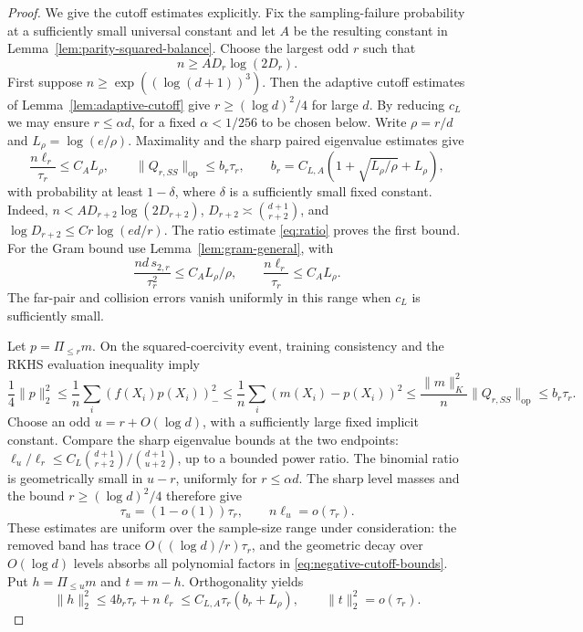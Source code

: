 \begin{proof}
We give the cutoff estimates explicitly. Fix the sampling-failure
probability at a sufficiently small universal constant and let $A$ be
the resulting constant in Lemma~\ref{lem:parity-squared-balance}.
Choose the largest odd $r$ such that
\[
 n\ge A D_r\log(2D_r).
\]
First suppose $n\ge\exp((\log(d+1))^3)$. Then the adaptive cutoff
estimates of Lemma~\ref{lem:adaptive-cutoff} give
$r\ge(\log d)^2/4$ for large $d$. By reducing $c_L$ we may ensure
$r\le\alpha d$, for a fixed $\alpha<1/256$ to be chosen below.
Write $\rho=r/d$ and $L_\rho=\log(e/\rho)$.
Maximality and the sharp paired eigenvalue estimates give
\begin{equation}\label{eq:negative-cutoff-bounds}
 \frac{n\ell_r}{\tau_r}\le C_A L_\rho,
 \qquad
 \|Q_{r,SS}\|_{\mathrm{op}}\le b_r\tau_r,
 \qquad b_r=C_{L,A}\left(1+\sqrt{L_\rho/\rho}+L_\rho\right),
\end{equation}
with probability at least $1-\delta$, where $\delta$ is a sufficiently
small fixed constant. Indeed,
$n<A D_{r+2}\log(2D_{r+2})$,
$D_{r+2}\asymp\binom{d+1}{r+2}$, and
$\log D_{r+2}\le C r\log(ed/r)$. The ratio estimate
\eqref{eq:ratio} proves the first bound. For the Gram bound use
Lemma~\ref{lem:gram-general}, with
\[
 \frac{nd\,s_{2,r}}{\tau_r^2}\le C_A L_\rho/\rho,
 \qquad \frac{n\ell_r}{\tau_r}\le C_A L_\rho.
\]
The far-pair and collision errors vanish uniformly in this range when
$c_L$ is sufficiently small.

Let $p=\Pi_{\le r}m$. On the squared-coercivity event,
training consistency and the RKHS evaluation inequality imply
\[
 \frac14\|p\|_2^2
 \le\frac1n\sum_i(f(X_i)p(X_i))_-^2
 \le\frac1n\sum_i(m(X_i)-p(X_i))^2
 \le\frac{\|m\|_K^2}{n}\|Q_{r,SS}\|_{\mathrm{op}}
 \le b_r\tau_r.
\]
Choose an odd $u=r+O(\log d)$, with a sufficiently large fixed implicit
constant. Compare the sharp eigenvalue bounds at the two endpoints:
$\ell_u/\ell_r\le C_L\binom{d+1}{r+2}/\binom{d+1}{u+2}$,
up to a bounded power ratio. The binomial ratio is geometrically small
in $u-r$, uniformly for $r\le\alpha d$. The sharp level masses
and the bound $r\ge(\log d)^2/4$ therefore give
\begin{equation}\label{eq:negative-high-cutoff}
 \tau_u=(1-o(1))\tau_r,\qquad n\ell_u=o(\tau_r).
\end{equation}
These estimates are uniform over the sample-size range under
consideration: the removed band has trace $O((\log d)/r)\tau_r$,
and the geometric decay over $O(\log d)$ levels absorbs all polynomial
factors in \eqref{eq:negative-cutoff-bounds}.
Put $h=\Pi_{\le u}m$ and $t=m-h$. Orthogonality yields
\begin{equation}\label{eq:negative-low-norm}
 \|h\|_2^2\le4b_r\tau_r+n\ell_r
             \le C_{L,A}\tau_r(b_r+L_\rho),
 \qquad \|t\|_2^2=o(\tau_r).
\end{equation}


\end{proof}
